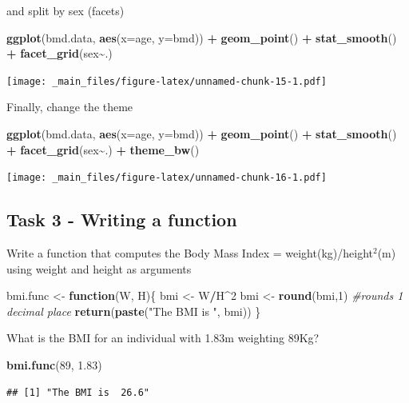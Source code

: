 \documentclass[
]{book}
\newenvironment{Shaded}{\begin{snugshade}}{\end{snugshade}}
\newcommand{\AttributeTok}[1]{\textcolor[rgb]{0.13,0.29,0.53}{#1}}
\newcommand{\CommentTok}[1]{\textcolor[rgb]{0.56,0.35,0.01}{\textit{#1}}}
\newcommand{\ControlFlowTok}[1]{\textcolor[rgb]{0.13,0.29,0.53}{\textbf{#1}}}
\newcommand{\DecValTok}[1]{\textcolor[rgb]{0.00,0.00,0.81}{#1}}
\newcommand{\FloatTok}[1]{\textcolor[rgb]{0.00,0.00,0.81}{#1}}
\newcommand{\FunctionTok}[1]{\textcolor[rgb]{0.13,0.29,0.53}{\textbf{#1}}}
\newcommand{\NormalTok}[1]{#1}
\newcommand{\OtherTok}[1]{\textcolor[rgb]{0.56,0.35,0.01}{#1}}
\newcommand{\SpecialCharTok}[1]{\textcolor[rgb]{0.81,0.36,0.00}{\textbf{#1}}}
\newcommand{\StringTok}[1]{\textcolor[rgb]{0.31,0.60,0.02}{#1}}
\begin{document}
and split by sex (facets)

\begin{Shaded}
\begin{Highlighting}[]
\FunctionTok{ggplot}\NormalTok{(bmd.data, }\FunctionTok{aes}\NormalTok{(}\AttributeTok{x=}\NormalTok{age, }\AttributeTok{y=}\NormalTok{bmd)) }\SpecialCharTok{+} 
        \FunctionTok{geom\_point}\NormalTok{() }\SpecialCharTok{+} 
        \FunctionTok{stat\_smooth}\NormalTok{() }\SpecialCharTok{+} 
        \FunctionTok{facet\_grid}\NormalTok{(sex}\SpecialCharTok{\textasciitilde{}}\NormalTok{.)}
\end{Highlighting}
\end{Shaded}

\texttt{[image: \_main\_files/figure-latex/unnamed-chunk-15-1.pdf]}

Finally, change the theme

\begin{Shaded}
\begin{Highlighting}[]
\FunctionTok{ggplot}\NormalTok{(bmd.data, }\FunctionTok{aes}\NormalTok{(}\AttributeTok{x=}\NormalTok{age, }\AttributeTok{y=}\NormalTok{bmd)) }\SpecialCharTok{+} 
        \FunctionTok{geom\_point}\NormalTok{() }\SpecialCharTok{+} 
        \FunctionTok{stat\_smooth}\NormalTok{() }\SpecialCharTok{+} 
        \FunctionTok{facet\_grid}\NormalTok{(sex}\SpecialCharTok{\textasciitilde{}}\NormalTok{.) }\SpecialCharTok{+} 
        \FunctionTok{theme\_bw}\NormalTok{()}
\end{Highlighting}
\end{Shaded}

\texttt{[image: \_main\_files/figure-latex/unnamed-chunk-16-1.pdf]}

\subsection{Task 3 - Writing a function}\label{task-3---writing-a-function}

Write a function that computes the Body Mass Index = weight(kg)/height\(^2\)(m)
using weight and height as arguments

\begin{Shaded}
\begin{Highlighting}[]
\NormalTok{bmi.func }\OtherTok{\textless{}{-}} \ControlFlowTok{function}\NormalTok{(W, H)\{}
\NormalTok{        bmi }\OtherTok{\textless{}{-}}\NormalTok{ W}\SpecialCharTok{/}\NormalTok{H}\SpecialCharTok{\^{}}\DecValTok{2}
\NormalTok{        bmi }\OtherTok{\textless{}{-}} \FunctionTok{round}\NormalTok{(bmi,}\DecValTok{1}\NormalTok{) }\CommentTok{\#rounds 1 decimal place }
        \FunctionTok{return}\NormalTok{(}\FunctionTok{paste}\NormalTok{(}\StringTok{"The BMI is "}\NormalTok{, bmi))}
\NormalTok{\}}
\end{Highlighting}
\end{Shaded}

What is the BMI for an individual with 1.83m weighting 89Kg?

\begin{Shaded}
\begin{Highlighting}[]
\FunctionTok{bmi.func}\NormalTok{(}\DecValTok{89}\NormalTok{, }\FloatTok{1.83}\NormalTok{)}
\end{Highlighting}
\end{Shaded}

\begin{verbatim}
## [1] "The BMI is  26.6"
\end{verbatim}
\end{document}
